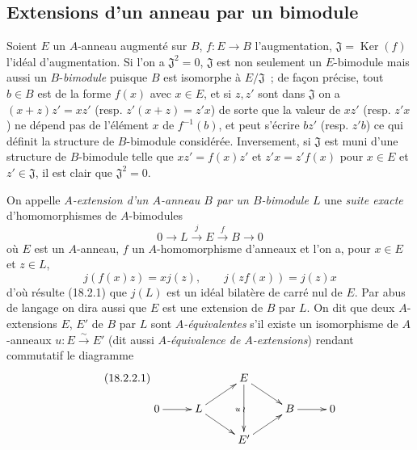 \subsection{Extensions d'un anneau par un bimodule}
\label{subsection:0.18.2-fr}

\begin{env}[18.2.1]
\label{0.18.2.1-fr}
Soient $E$ un $A$-anneau augmenté sur $B$, $f:E\to B$ l'augmentation,
$\mathfrak{J}=\operatorname{Ker}(f)$ l'idéal d'augmentation. Si l'on a
$\mathfrak{J}^2=0$, $\mathfrak{J}$ est non seulement un $E$-bimodule mais
aussi un $B$-\emph{bimodule} puisque $B$ est isomorphe à
$E/\mathfrak{J}$~; de façon précise, tout $b\in B$ est de la forme $f(x)$
avec $x\in E$, et si $z,z'$ sont dans $\mathfrak{J}$ on a
$(x+z)z'=xz'$ (resp. $z'(x+z)=z'x$) de sorte que la valeur de $xz'$ (resp.
$z'x$) ne dépend pas de l'élément $x$ de $f^{-1}(b)$, et peut s'écrire $bz'$
(resp. $z'b$) ce qui définit la structure de $B$-bimodule considérée.
Inversement, si $\mathfrak{J}$ est muni d'une structure de $B$-bimodule telle
que $xz'=f(x)z'$ et $z'x=z'f(x)$ pour $x\in E$ et
$z'\in\mathfrak{J}$, il est clair que $\mathfrak{J}^2=0$.
\end{env}

\begin{env}[18.2.2]
\label{0.18.2.2-fr}
On appelle \emph{$A$-extension d'un $A$-anneau $B$ par un $B$-bimodule $L$}
une \emph{suite exacte} d'homomorphismes de $A$-bimodules
\[
  0\longrightarrow L\xrightarrow{j}E\xrightarrow{f}B\longrightarrow0
\]
où $E$ est un $A$-anneau, $f$ un $A$-homomorphisme d'anneaux et l'on a, pour
$x\in E$ et $z\in L$,
\[
  j(f(x)z)=xj(z),\qquad j(zf(x))=j(z)x
\]
d'où résulte (18.2.1) que $j(L)$ est un idéal bilatère de carré nul de $E$.
Par abus de langage on dira aussi que $E$ est une extension de $B$ par $L$.
On dit que deux $A$-extensions $E$, $E'$ de $B$ par $L$ sont
\emph{$A$-équivalentes} s'il existe un isomorphisme de $A$-anneaux
$u:E\xrightarrow{\sim}E'$ (dit aussi \emph{$A$-équivalence de
$A$-extensions}) rendant commutatif le diagramme
\begin{equation}
\label{0.18.2.2.1-fr}
\tag{18.2.2.1}
  \xymatrix@C=2.1pc@R=1.2pc{
    & & E\ar[dr]\ar[dd]_u\ar@{}[dd]|{\wr} & & \\
    0\ar[r] & L\ar[ur]\ar[dr] & & B\ar[r] & 0\\
    & & E'\ar[ur] & &
  }
\end{equation}
\end{env}


